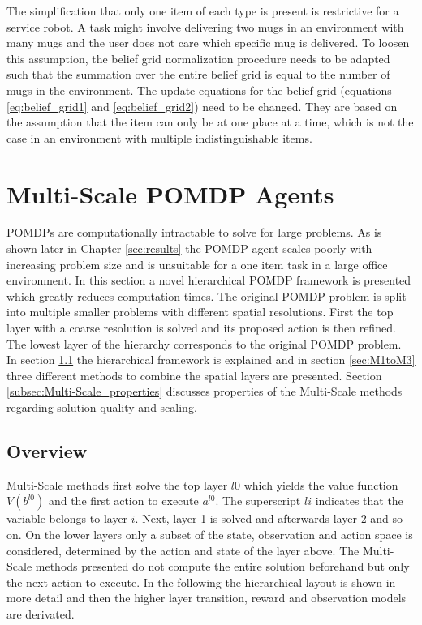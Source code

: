 The simplification that only one item of each type is present is restrictive for a service robot. A task might involve delivering two mugs in an environment with many mugs and the user does not care which specific mug is delivered. To loosen this assumption, the belief grid normalization procedure needs to be adapted such that the summation over the entire belief grid is equal to the number of mugs in the environment. The update equations for the belief grid (equations \ref{eq:belief_grid1} and \ref{eq:belief_grid2}) need to be changed. They are based on the assumption that the item can only be at one place at a time, which is not the case in an environment with multiple indistinguishable items.
 
\section{Multi-Scale POMDP Agents}\label{sec:Multi-Scale}
POMDPs are computationally intractable to solve for large problems. As is shown later in Chapter \ref{sec:results} the POMDP agent scales poorly with increasing problem size and is unsuitable for a one item task in a large office environment. In this section a novel hierarchical POMDP framework is presented which greatly reduces computation times. The original POMDP problem is split into multiple smaller problems with different spatial resolutions. First the top layer with a coarse resolution is solved and its proposed action is then refined. The lowest layer of the hierarchy corresponds to the original POMDP problem.\\
In section \ref{subsec:Multi-Scale_overview} the hierarchical framework is explained and in section \ref{sec:M1toM3} three different methods to combine the spatial layers are presented. Section \ref{subsec:Multi-Scale_properties} discusses properties of the Multi-Scale methods regarding solution quality and scaling. 

\subsection{Overview} \label{subsec:Multi-Scale_overview}
Multi-Scale methods first solve the top layer $l0$ which yields the value function $V(b^{l0})$ and the first action to execute $a^{l0}$. The superscript $li$ indicates that the variable belongs to layer $i$. Next, layer 1 is solved and afterwards layer 2 and so on. On the lower layers only a subset of the state, observation and action space is considered, determined by the action and state of the layer above. The Multi-Scale methods presented do not compute the entire solution beforehand but only the next action to execute. In the following the hierarchical layout is shown in more detail and then the higher layer transition, reward and observation models are derivated.

